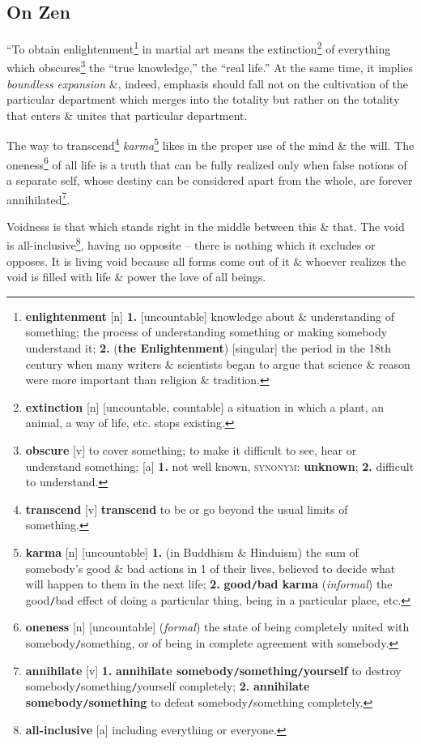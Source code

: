 \documentclass[oneside]{book}
\numberwithin{equation}{section}
\begin{document}
\subsection{On Zen}
``To obtain enlightenment\footnote{\textbf{enlightenment} [n] \textbf{1.} [uncountable] knowledge about \& understanding of something; the process of understanding something or making somebody understand it; \textbf{2.} (\textbf{the Enlightenment}) [singular] the period in the 18th century when many writers \& scientists began to argue that science \& reason were more important than religion \& tradition.} in martial art means the extinction\footnote{\textbf{extinction} [n] [uncountable, countable] a situation in which a plant, an animal, a way of life, etc. stops existing.} of everything which obscures\footnote{\textbf{obscure} [v] to cover something; to make it difficult to see, hear or understand something; [a] \textbf{1.} not well known, \textsc{synonym}: \textbf{unknown}; \textbf{2.} difficult to understand.} the ``true knowledge,'' the ``real life.'' At the same time, it implies \textit{boundless expansion} \&, indeed, emphasis should fall not on the cultivation of the particular department which merges into the totality but rather on the totality that enters \& unites that particular department.

The way to transcend\footnote{\textbf{transcend} [v] \textbf{transcend} to be or go beyond the usual limits of something.} \textit{karma}\footnote{\textbf{karma} [n] [uncountable] \textbf{1.} (in Buddhism \& Hinduism) the sum of somebody's good \& bad actions in 1 of their lives, believed to decide what will happen to them in the next life; \textbf{2.} \textbf{good\texttt{/}bad karma} (\textit{informal}) the good\texttt{/}bad effect of doing a particular thing, being in a particular place, etc.} likes in the proper use of the mind \& the will. The oneness\footnote{\textbf{oneness} [n] [uncountable] (\textit{formal}) the state of being completely united with somebody\texttt{/}something, or of being in complete agreement with somebody.} of all life is a truth that can be fully realized only when false notions of a separate self, whose destiny can be considered apart from the whole, are forever annihilated\footnote{\textbf{annihilate} [v] \textbf{1.} \textbf{annihilate somebody\texttt{/}something\texttt{/}yourself} to destroy somebody\texttt{/}something\texttt{/}yourself completely; \textbf{2.} \textbf{annihilate somebody\texttt{/}something} to defeat somebody\texttt{/}something completely.}.

Voidness is that which stands right in the middle between this \& that. The void is all-inclusive\footnote{\textbf{all-inclusive} [a] including everything or everyone.}, having no opposite -- there is nothing which it excludes or opposes. It is living void because all forms come out of it \& whoever realizes the void is filled with life \& power the love of all beings.
\end{document}
